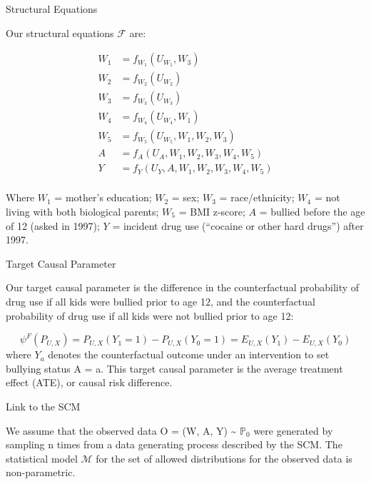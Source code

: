\documentclass[ignorenonframetext,]{beamer}
\begin{document}
\begin{frame}{Structural Equations}

Our structural equations \(\mathcal{F}\) are:

\[
\begin{aligned}
W_1 &= f_{W_1} (U_{W_1}, W_3) \\
W_2  &= f_{W_2}  (U_{W_2}) \\
W_3  &= f_{W_3}  (U_{W_3}) \\
W_4  &= f_{W_4} (U_{W_4}, W_1) \\
W_5  &= f_{W_5} (U_{W_5}, W_1, W_2, W_3) \\
A &= f_A (U_A, W_1, W_2, W_3, W_4, W_5) \\
Y &= f_Y (U_Y, A, W_1, W_2, W_3, W_4, W_5) \\
\end{aligned}
\]

\vspace{12pt}

Where \(W_1\) = mother's education; \(W_2\) = sex; \(W_3\) =
race/ethnicity; \(W_4\) = not living with both biological parents;
\(W_5\) = BMI z-score; \(A\) = bullied before the age of 12 (asked in
1997); \(Y\) = incident drug use (``cocaine or other hard drugs'') after
1997.

\end{frame}

\begin{frame}{Target Causal Parameter}

Our target causal parameter is the difference in the counterfactual
probability of drug use if all kids were bullied prior to age 12, and
the counterfactual probability of drug use if all kids were not bullied
prior to age 12:

\[
\psi^F (P_{U,X}) = P_{U,X} (Y_1 = 1) - P_{{U,X}}(Y_0=1) = E_{U,X}(Y_1) - E_{U,X}(Y_0)
\] where \(Y_a\) denotes the counterfactual outcome under an
intervention to set bullying status A = a. This target causal parameter
is the average treatment effect (ATE), or causal risk difference.

\end{frame}

\begin{frame}{Link to the SCM}

We assume that the observed data O = (W, A, Y) \textasciitilde{}
\(\mathbb{P}_0\) were generated by sampling n times from a data
generating process described by the SCM. The statistical model
\(\mathcal{M}\) for the set of allowed distributions for the observed
data is non-parametric.

\end{frame}
\end{document}
